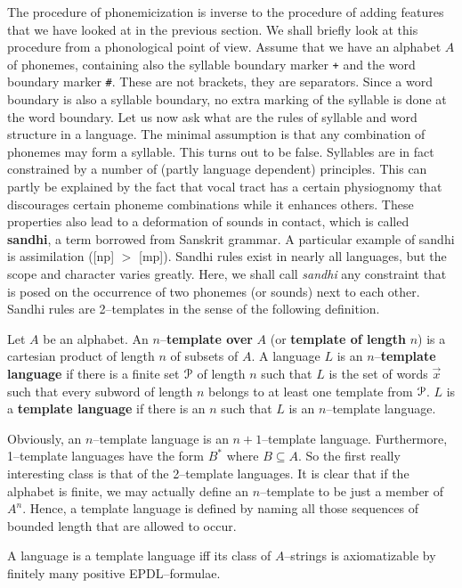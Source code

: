 The procedure of phonemicization is inverse to the procedure of
adding features that we have looked at in the previous section.
We shall briefly look at this procedure from a phonological
point of view. Assume that we have an alphabet $A$ of phonemes,
containing also the syllable boundary marker {\tt +} and the
word boundary marker {\tt \#}. These are not brackets, they are separators.
Since a word boundary is also a syllable boundary, no extra marking
of the syllable is done at the word boundary. Let us now ask what
are the rules of syllable and word structure in a language. The
minimal assumption is that any combination of phonemes may form
a syllable. This turns out to be false. Syllables are in fact
constrained by a number of (partly language dependent) principles.
This can partly be explained by the fact that vocal tract has a 
certain physiognomy that discourages certain phoneme combinations 
while it enhances others. These properties also lead to a deformation 
of sounds in contact,
which is called \textbf{sandhi}, a term borrowed from Sanskrit grammar.
A particular example of sandhi is assimilation ([np] $>$ [mp]). Sandhi
rules exist in nearly all languages, but the scope and character varies
greatly. Here, we shall call {\it sandhi\/} any constraint that
is posed on the occurrence of two phonemes (or sounds) next to
each other. Sandhi rules are 2--templates in the sense of the 
following definition.
\begin{defn}
Let $A$ be an alphabet. An $n$--\textbf{template over} $A$ (or
\textbf{template of length} $n$) is a cartesian product of length
$n$ of subsets of $A$. A language $L$ is an $n$--\textbf{template
language} if there is a finite set $\mathcal{P}$ of length $n$ such that
$L$ is the set of words $\vec{x}$ such that every subword of length
$n$ belongs to at least one template from $\mathcal{P}$. $L$ is a
\textbf{template language} if there is an $n$ such that $L$ is
an $n$--template language.
\end{defn}
Obviously, an $n$--template language is an $n+1$--template language.
Furthermore, 1--template languages have the form $B^{\ast}$ where
$B \subseteq A$. So the first really interesting class is that of
the 2--template languages.  It is clear that if the alphabet is finite,
we may actually define an $n$--template to be just a member of $A^n$.
Hence, a template language is defined by naming all those sequences
of bounded length that are allowed to occur.
\begin{prop}
A language is a template language iff its class of
$A$--strings is axiomatizable by finitely many positive 
EPDL--formulae.
\end{prop}
